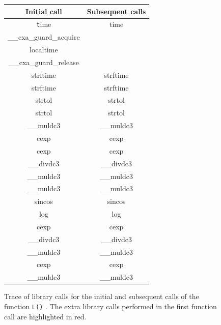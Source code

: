 \begin{figure}[h]
    \centering

    \begin{tabular}{cc}
    \toprule
    Initial call & Subsequent calls \\

    \midrule

    \texttt
        time                                    & time        \\
        {\color{red} \_\_cxa\_guard\_acquire }  &             \\
        {\color{red} localtime }                &             \\
        {\color{red} \_\_cxa\_guard\_release }  &             \\
        strftime                                & strftime    \\
        strftime                                & strftime    \\
        strtol                                  & strtol      \\
        strtol                                  & strtol      \\
        \_\_muldc3                              & \_\_muldc3  \\
        cexp                                    & cexp        \\
        cexp                                    & cexp        \\
        \_\_divdc3                              & \_\_divdc3  \\
        \_\_muldc3                              & \_\_muldc3  \\
        \_\_muldc3                              & \_\_muldc3  \\
        sincos                                  & sincos      \\
        log                                     & log         \\
        cexp                                    & cexp        \\
        \_\_divdc3                              & \_\_divdc3  \\
        \_\_muldc3                              & \_\_muldc3  \\
        cexp                                    & cexp        \\
        \_\_muldc3                              & \_\_muldc3  \\
    \bottomrule
    \end{tabular}

    \caption{Trace of library calls for the initial and subsequent calls of the function \texttt{L()} . The extra library calls performed in the first function call are highlighted in red.}
    \label{fig:l-calls}
\end{figure}


